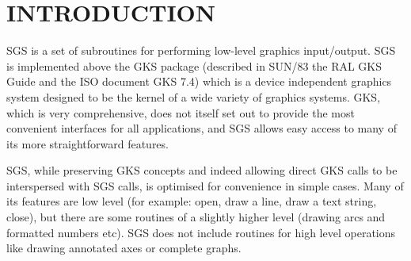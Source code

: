 \documentclass[11pt]{article}
\newcommand{\stardocinitials}  {SUN}
\newcommand{\stardocnumber}    {85.6}
\newcommand{\stardocname}{\stardocinitials /\stardocnumber}
\newcommand{\htmladdimg}[1]{}
\newenvironment{latexonly}{}{}
\newcommand{\htmlref}[2]{#1}
\newcommand{\htmladdtonavigation}[1]{}
\newcommand{\xref}[3]{#1}
\begin{document}
%

\section{INTRODUCTION}

SGS is a set of subroutines for performing low-level graphics input/output.
SGS is implemented above the GKS package (described in \xref{SUN/83}{sun83},
the RAL GKS Guide
and the ISO document GKS 7.4) which is a device independent graphics system
designed to be the kernel of a wide variety of graphics systems.
GKS, which is very comprehensive, does not itself set out to provide the most
convenient interfaces for all applications, and SGS allows easy access to many
of its more straightforward features.

SGS, while preserving GKS concepts and indeed allowing direct GKS calls to be
interspersed with SGS calls, is optimised for convenience in simple cases.
Many of its features are low level (for example: open, draw a line, draw a text
string, close), but there are some routines of a slightly higher level (drawing
arcs and formatted numbers etc).
SGS does not include routines for high level operations like drawing annotated
axes or complete graphs.
\end{document}
